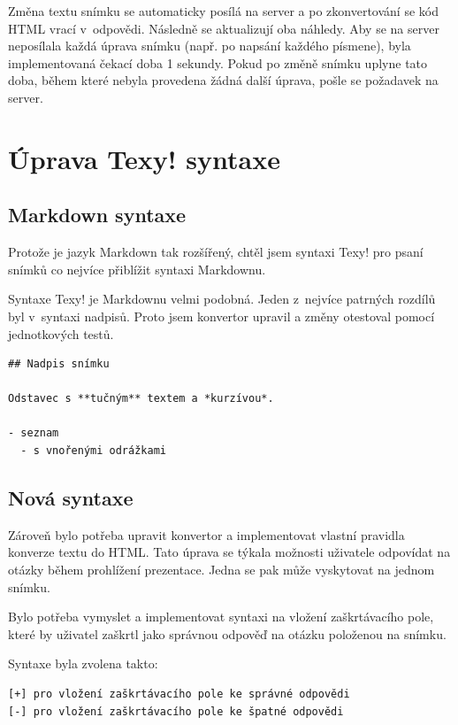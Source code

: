 \documentclass[11pt,twoside,a4paper]{book}
\begin{document}
Změna textu snímku se automaticky posílá na server a po zkonvertování se kód HTML vrací v~odpovědi. Následně se
aktualizují oba náhledy. Aby se na server neposílala každá úprava snímku (např. po napsání každého písmene), byla
implementovaná čekací doba 1 sekundy. Pokud po změně snímku uplyne tato doba, během které nebyla provedena žádná další
úprava, pošle se požadavek na server.


\section{Úprava Texy! syntaxe}

\subsection{Markdown syntaxe}
Protože je jazyk Markdown tak rozšířený, chtěl jsem syntaxi Texy! pro psaní snímků co nejvíce přiblížit syntaxi
Markdownu.

Syntaxe Texy! je Markdownu velmi podobná. Jeden z~nejvíce patrných rozdílů byl v~syntaxi nadpisů. Proto jsem konvertor
upravil a změny otestoval pomocí jednotkových testů.

\begin{lstlisting}[caption=Ukázka syntaxe]
## Nadpis snímku

Odstavec s **tučným** textem a *kurzívou*.

- seznam
  - s vnořenými odrážkami
\end{lstlisting}

\subsection{Nová syntaxe}
Zároveň bylo potřeba upravit konvertor a implementovat vlastní pravidla konverze textu do HTML. Tato úprava se týkala
možnosti uživatele odpovídat na otázky během prohlížení prezentace. Jedna se pak může vyskytovat na jednom snímku.

Bylo potřeba vymyslet a implementovat syntaxi na vložení zaškrtávacího pole, které by uživatel zaškrtl jako správnou
odpověď na otázku položenou na snímku.

Syntaxe byla zvolena takto:

\begin{lstlisting}[caption=Syntaxe odpovědí]
[+] pro vložení zaškrtávacího pole ke správné odpovědi
[-] pro vložení zaškrtávacího pole ke špatné odpovědi
\end{lstlisting}
\end{document}
